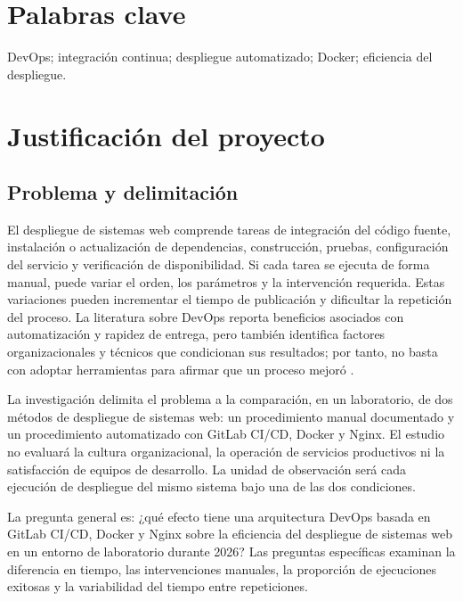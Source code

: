\documentclass[12pt,a4paper]{article}
\begin{document}
\section{Palabras clave}

DevOps; integración continua; despliegue automatizado; Docker; eficiencia del despliegue.

\section{Justificación del proyecto}

\subsection{Problema y delimitación}

El despliegue de sistemas web comprende tareas de integración del código fuente, instalación o actualización de dependencias, construcción, pruebas, configuración del servicio y verificación de disponibilidad. Si cada tarea se ejecuta de forma manual, puede variar el orden, los parámetros y la intervención requerida. Estas variaciones pueden incrementar el tiempo de publicación y dificultar la repetición del proceso. La literatura sobre DevOps reporta beneficios asociados con automatización y rapidez de entrega, pero también identifica factores organizacionales y técnicos que condicionan sus resultados; por tanto, no basta con adoptar herramientas para afirmar que un proceso mejoró \citep{faustino2022,azad2023}.

La investigación delimita el problema a la comparación, en un laboratorio, de dos métodos de despliegue de sistemas web: un procedimiento manual documentado y un procedimiento automatizado con GitLab CI/CD, Docker y Nginx. El estudio no evaluará la cultura organizacional, la operación de servicios productivos ni la satisfacción de equipos de desarrollo. La unidad de observación será cada ejecución de despliegue del mismo sistema bajo una de las dos condiciones.

La pregunta general es: ¿qué efecto tiene una arquitectura DevOps basada en GitLab CI/CD, Docker y Nginx sobre la eficiencia del despliegue de sistemas web en un entorno de laboratorio durante 2026? Las preguntas específicas examinan la diferencia en tiempo, las intervenciones manuales, la proporción de ejecuciones exitosas y la variabilidad del tiempo entre repeticiones.
\end{document}
